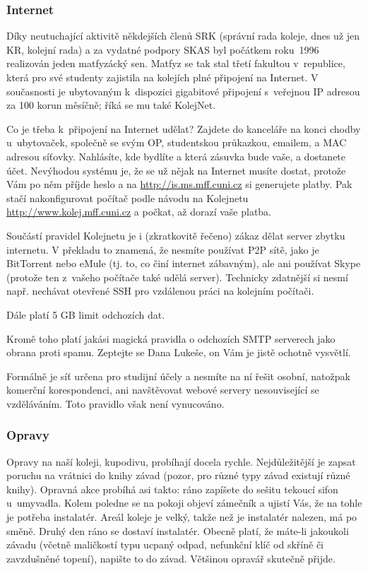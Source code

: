 \subsubsection{Internet}

Díky neutuchající aktivitě někdejších členů SRK (správní rada
koleje, dnes už jen KR, kolejní rada) a za vydatné podpory SKAS
byl počátkem roku~1996 realizován jeden matfyzácký sen. Matfyz se
tak stal třetí fakultou v~republice, která pro své studenty
zajistila na kolejích plné připojení na Internet. V současnosti je ubytovaným k~dispozici gigabitové připojení s~veřejnou IP adresou za 100 korun měsíčně; říká se mu také KolejNet.

Co je třeba k~připojení na Internet udělat?
Zajdete do kanceláře na konci chodby u~ubytovaček, společně se svým OP, studentskou průkazkou, emailem, a MAC adresou síťovky. Nahlásíte, kde bydlíte a která zásuvka bude vaše, a dostanete účet. 
Nevýhodou systému je,
že se už nějak na Internet musíte dostat, protože Vám po něm
příjde heslo a na \url{http://is.ms.mff.cuni.cz} si generujete
platby. Pak stačí nakonfigurovat počítač podle návodu na Kolejnetu
\url{http://www.kolej.mff.cuni.cz} a počkat, až dorazí vaše
platba.


Součástí pravidel Kolejnetu je i (zkratkovitě řečeno) zákaz dělat server zbytku internetu. V překladu to znamená, že nesmíte používat P2P sítě, jako je BitTorrent nebo eMule (tj. to, co činí internet zábavným), ale ani používat Skype (protože ten z~vašeho počítače také udělá server). Technicky zdatnější si nesmí např. nechávat otevřené SSH pro vzdálenou práci na kolejním počítači.

Dále platí 5 GB limit odchozích dat.

Kromě toho platí jakási magická pravidla o odchozích SMTP serverech jako obrana proti spamu. Zeptejte se Dana Lukeše, on Vám je jistě ochotně vysvětlí.

Formálně je síť určena pro studijní účely a nesmíte na ní řešit osobní, natožpak komerční korespondenci, ani navštěvovat webové servery nesouvisející se vzdě\-lá\-vá\-ním. Toto pravidlo však není vynucováno.


\subsubsection{Opravy}

Opravy na naší koleji, kupodivu, probíhají docela rychle. Nejdůležitější
je zapsat poruchu na vrátnici do knihy závad (pozor, pro různé typy závad
existují různé knihy). Opravná akce probíhá asi takto: ráno zapíšete
do sešitu tekoucí sifon u~umyvadla. Kolem poledne se na pokoji objeví
zámečník a ujistí Vás, že na tohle je potřeba instalatér. Areál koleje je
velký, takže než je instalatér nalezen, má po směně. Druhý den ráno se
dostaví instalatér.  Obecně platí, že máte-li jakoukoli závadu (včetně
maličkostí typu ucpaný odpad, nefunkční klíč od skříně či zavzdušněné
topení), napište to do závad. Většinou opravář skutečně přijde.


